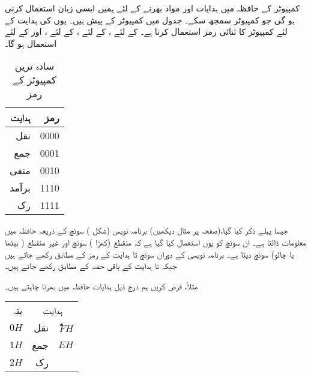 کمپیوٹر کے  حافظہ میں ہدایات اور مواد بھرنے کے لئے ہمیں ایسی زبان استعمال کرنی ہو گی جو کمپیوٹر  سمجھ سکے۔ جدول   میں  کمپیوٹر  کے  پیش ہیں۔ یوں  کی ہدایت کے لئے کمپیوٹر  کا  ثنائی رمز استعمال کرتا ہے۔ کے لئے ،  کے لئے ، کے لئے ، اور  کے لئے  استعمال ہو گا۔ 
\begin{table}
\caption{سادہ ترین کمپیوٹر کے رمز}
\label{جدول_کمپیوٹر_رموز}
\centering
\begin{tabular}{rr}
\toprule
ہدایت&رمز\\
\midrule
نقل&0000\\
جمع&0001\\
منفی&0010\\
برآمد&1110\\
رک&1111\\
\bottomrule
\end{tabular}
\end{table}

\begin{figure}

\end{figure}

جیسا پہلے ذکر کیا گیا،(صفحہ  پر مثال  دیکھیں) برنامہ نویس (شکل )  سوئچ  کے ذریعہ  حافظہ میں معلومات ڈالتا ہے۔ ان سوئچ کو یوں استعمال کیا گیا ہے کہ منقطع (کھڑا ) سوئچ  اور غیر منقطع ( بیٹھا  یا چالو) سوئچ  دیتا ہے۔ برنامہ نویسی کے دوران سوئچ  تا    ہدایت  کے رمز کے مطابق رکھے جاتے ہیں جبکہ  تا   ہدایت کے باقی حصہ کے مطابق رکھے جاتے ہیں۔

مثلاً،  فرض کریں ہم درج ذیل  ہدایات حافظہ میں بھرنا چاہتے ہیں۔
\begin{center}
\begin{tabular}{rrr}
پتہ&\multicolumn{2}{c}{ہدایت}\\[1ex]
$0H$& نقل& $ّFH$\\
$1H$&جمع& $EH$\\
$2H$&رک&
\end{tabular}
\end{center}

